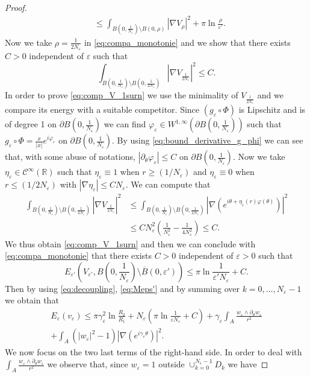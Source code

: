 \documentclass[12pt,reqno]{amsart}
\def\C{{\mathcal C}}
\def\e {{\varepsilon}}
\def \p {\partial}
\newcommand{\R}{\mathbb{R}}
\numberwithin{equation}{section}
\begin{document}
\begin{proof}
\begin{align*}
&\leq \int_{B(0,\frac{1}{N_\e})\setminus B(0,\rho)}|\nabla V_\rho|^2+\pi \ln \frac{\rho}{\e'}.
\end{align*}
Now we take \(\rho=\frac{1}{2N_\e}\) in \eqref{eq:compa_monotonie} and we show that there exists \(C>0\) independent of \(\e\) such that 
\begin{equation}\label{eq:comp_V_1surn}
\int_{B(0,\frac{1}{N_\e})\setminus B(0,\frac{1}{2N_\e})}|\nabla V_{\frac{1}{2N_\e}}|^2 \leq C.
\end{equation}
In order to prove \eqref{eq:comp_V_1surn} we use the minimality of \(V_{\frac{1}{2N_\e}}\) and we compare its energy with a suitable competitor. Since \((g_\e\circ \Phi)\) is Lipschitz and is of degree 1 on \(\p B(0,\frac{1}{N_\e})\) we can find \(\varphi_\e\in W^{1,\infty}(\p B(0,\frac{1}{N_\e}))\) such that \( g_\e\circ \Phi=\frac{x}{|x|}e^{i\varphi_\e}\) on \( \p B(0,\frac{1}{N_\e})\). By using \eqref{eq:bound_derivative_g_phi} we can see that, with some abuse of notations, \(|\p_\theta \varphi_\e|\leq C\) on \( \p B(0,\frac{1}{N_\e})\). Now we take \(\eta_\e\in \C^\infty(\R)\) such that \(\eta_\e \equiv 1\) when \(r\geq (1/N_\e)\) and \(\eta_\e\equiv 0\) when \(r \leq (1/2N_\e)\) with \(|\nabla \eta_\e|\leq C N_\e\). We can compute that 
  \begin{align*}
  \int_{B(0,\frac{1}{N_\e})\setminus B(0,\frac{1}{2N_\e})}|\nabla V_{\frac{1}{2N_\e}}|^2 & \leq \int_{B(0,\frac{1}{N_\e})\setminus B(0,\frac{1}{2N_\e})} |\nabla (e^{i\theta+\eta_\e(r)\varphi(\theta)})|^2 \\
  & \leq C N_\e^2 \left( \frac{1}{N_\e^2}-\frac{1}{4N_\e^2}\right) \leq C.
  \end{align*}
We thus obtain \eqref{eq:comp_V_1surn} and then we can conclude with \eqref{eq:compa_monotonie} that there exists \(C>0\) independent of \(\e>0\) such that 
\begin{equation*}
E_{\e'}(V_{\e'}, B(0,\frac{1}{N_\e})\setminus \overline{B}(0,\e') ) \leq \pi \ln \frac{1}{\e' N_\e}+C.
\end{equation*}
Then by using \eqref{eq:decoupling}, \eqref{eq:Meps'} and by summing over \(k=0,\dots,N_\e-1\) we obtain that
\begin{multline}\label{eq:upper_int}
E_\e(v_\e)\leq \pi \gamma_\e^2\ln \frac{R_2}{R_1}+N_\e (\pi \ln \frac{1}{\e N_\e}+C)+\gamma_\e \int_{A} \frac{w_\e\wedge \p_\theta w_\e}{r^2}\\
+ \int_{A} (|w_\e|^2-1)|\nabla (e^{i\gamma_\e \theta})|^2.
\end{multline}
We now focus on the two last terms of the right-hand side. In order to deal with \(\int_{A} \frac{w_\e\wedge \p_\theta w_\e}{r^2}\) we observe that, since \(w_\e=1\) outside \(\cup_{k=0}^{N_\e-1}D_k\) we have


\end{proof}
\end{document}

